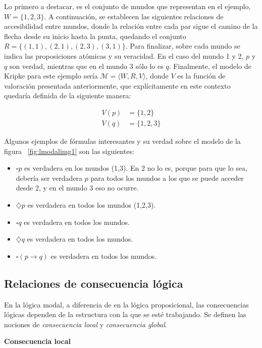 Lo primero a destacar, es el conjunto de mundos que representan en el ejemplo, $W = \lbrace 1,2,3 \rbrace$. A continuación, se establecen las siguientes relaciones de accesibilidad entre mundos, donde la relación entre cada par sigue el camino de la flecha desde su inicio hasta la punta, quedando el conjunto $R = \lbrace (1,1), (2,1), (2,3), (3,1) \rbrace$. Para finalizar, sobre cada mundo se indica las proposiciones atómicas y su veracidad. En el caso del mundo 1 y 2, $p$ y $q$ son verdad, mientras que en el mundo 3 sólo lo es $q$. Finalmente, el modelo de Kripke para este ejemplo sería $\mathcal{M} = \langle W,R,V \rangle$, donde $V$ es la función de valoración presentada anteriormente, que explícitamente en este contexto quedaría definida de la siguiente manera:

\begin{align*}
    V(p) &= \lbrace 1,2 \rbrace \\
    V(q) &= \lbrace 1,2,3 \rbrace
\end{align*}

Algunos ejemplos de fórmulas interesantes y su verdad sobre el modelo de la figura ~\ref{fig:lmodalimg1} son las siguientes:
\begin{itemize}
    \item $\square p $ es verdadera en los mundos (1,3). En 2 no lo es, porque para que lo sea, debería ser verdadera $p$ para todos los mundos a los que se puede acceder desde 2, y en el mundo 3 eso no ocurre.
    \item $\diamondsuit p$ es verdadera en todos los mundos (1,2,3).
    \item $\square q$ es verdadera en todos los mundos.
    \item $\diamondsuit q$ es verdadera en todos los mundos.
    \item $\square(p \rightarrow q)$ es verdadera en todos los mundos.
\end{itemize}

\subsection{Relaciones de consecuencia lógica}\label{subsection:lmodalconsec}
En la lógica modal, a diferencia de en la lógica proposicional, las consecuencias lógicas dependen de la estructura con la que se esté trabajando. Se definen las nociones de \textit{consecuencia local} y \textit{consecuencia global}.

\vspace{0.5cm}
\noindent
\textbf{Consecuencia local}

